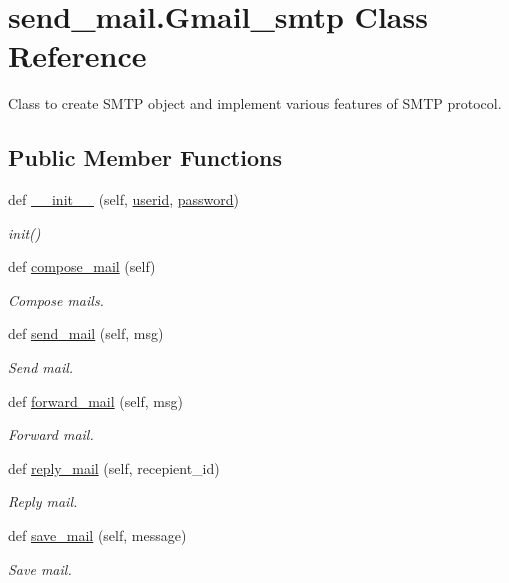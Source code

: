 \hypertarget{classsend__mail_1_1Gmail__smtp}{}\section{send\+\_\+mail.\+Gmail\+\_\+smtp Class Reference}
\label{classsend__mail_1_1Gmail__smtp}


Class to create S\+M\+TP object and implement various features of S\+M\+TP protocol.  


\subsection*{Public Member Functions}
\begin{DoxyCompactItemize}
\item 
def \hyperlink{classsend__mail_1_1Gmail__smtp_ab01b2da16cf30b53a9515790152403e0}{\+\_\+\+\_\+init\+\_\+\+\_\+} (self, \hyperlink{classsend__mail_1_1Gmail__smtp_a0955e443227792ac46cf043b6a92af2c}{userid}, \hyperlink{classsend__mail_1_1Gmail__smtp_a9701290209cdd9f389fc94c0a0ac0019}{password})
\begin{DoxyCompactList}\small\item\em init() \end{DoxyCompactList}\item 
def \hyperlink{classsend__mail_1_1Gmail__smtp_af52d3af745505aadedb5a835695dafb3}{compose\+\_\+mail} (self)
\begin{DoxyCompactList}\small\item\em Compose mails. \end{DoxyCompactList}\item 
def \hyperlink{classsend__mail_1_1Gmail__smtp_ab7dbba6a289f09f2abc986f586d26bb8}{send\+\_\+mail} (self, msg)
\begin{DoxyCompactList}\small\item\em Send mail. \end{DoxyCompactList}\item 
def \hyperlink{classsend__mail_1_1Gmail__smtp_ab5cad365d00df351e1e8a6237aa84de2}{forward\+\_\+mail} (self, msg)
\begin{DoxyCompactList}\small\item\em Forward mail. \end{DoxyCompactList}\item 
def \hyperlink{classsend__mail_1_1Gmail__smtp_a563427189f1bdb41f71630767a0fa5ff}{reply\+\_\+mail} (self, recepient\+\_\+id)
\begin{DoxyCompactList}\small\item\em Reply mail. \end{DoxyCompactList}\item 
def \hyperlink{classsend__mail_1_1Gmail__smtp_ae3ca9a4080b5236ef5f3499e509fb3d0}{save\+\_\+mail} (self, message)
\begin{DoxyCompactList}\small\item\em Save mail. \end{DoxyCompactList}\end{DoxyCompactItemize}
